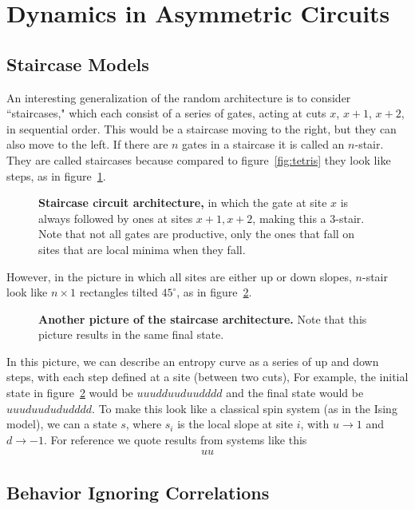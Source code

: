 \section{Dynamics in Asymmetric Circuits} \label{sec:stairs}

\subsection{Staircase Models} \label{sub:stairs}

An interesting generalization of the random architecture is to consider ``staircases," which each consist of a series of gates, acting at cuts $x$, $x+1$, $x+2$, in sequential order. This would be a staircase moving to the right, but they can also move to the left. If there are $n$ gates in a staircase it is called an $n$-stair. They are called staircases because compared to figure~\ref{fig:tetris} they look like steps, as in figure~\ref{fig:stairs}. 
\begin{figure}
	\centering
	
	\caption{\textbf{Staircase circuit architecture,} in which the gate at site $x$ is always followed by ones at sites $x+1, x+2$, making this a 3-stair. Note that not all gates are productive, only the ones that fall on sites that are local minima when they fall.}
	\label{fig:stairs}
\end{figure}
However, in the picture in which all sites are either up or down slopes, $n$-stair look like $n\times 1$ rectangles tilted $45^\circ$, as in figure~\ref{fig:diagstairs}.
\begin{figure}
	\centering
	
	\caption{\textbf{Another picture of the staircase architecture.} Note that this picture results in the same final state.}
	\label{fig:diagstairs}
\end{figure}

In this picture, we can describe an entropy curve as a series of up and down steps, with each step defined at a site (between two cuts), For example, the initial state in figure~\ref{fig:diagstairs} would be $uuudduuduudddd$ and the final state would be $uuuduudududddd$. To make this look like a classical spin system (as in the Ising model), we can a state $s$, where $s_i$ is the local slope at site $i$, with $u\to1$ and $d\to-1$. For reference we quote results from systems like this
\begin{align}
uu
\end{align}

\subsection{Behavior Ignoring Correlations} \label{sub:anal}

